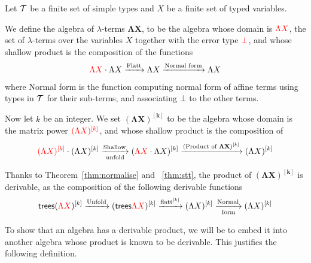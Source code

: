 \begin{example} Let $\Tt$ be a finite set of simple types and $X$ be a finite set of typed variables. 

We define the algebra of $\lambda$-terms $\mathbf{\Lambda X}$, to be the algebra whose domain is $\ranked{\Lambda X}$, the set of $\lambda$-terms over the variables $X$ together with the error type $\ranked{\bot}$, and whose shallow product is the composition of the functions
\begin{align*}
\ranked{\Lambda X}\cdot \Lambda X \xrightarrow{\text{Flatt}} \Lambda X \xrightarrow{\text{Normal form}} \Lambda X 
\end{align*}
where Normal form is the function computing normal form of affine terms using types in $\Tt$ for their sub-terms, and associating $\bot$ to the other terms. 



Now let $k$ be an integer. We set $\mathbf{(\Lambda X)^{[k]}}$ to be the algebra whose domain is the matrix power $\ranked{\mati k {(\Lambda X)}}$, and whose shallow product is the composition of 
\begin{align*}
\ranked{(\Lambda X)^{[k]}}\cdot (\Lambda X)^{[k]} \underset{\text{unfold}}{\xrightarrow{\text{Shallow}}} (\ranked{\Lambda X}\cdot \Lambda X)^{[k]}  \xrightarrow{(\text{Product of }\mathbf{\Lambda X})^{[k]}} (\Lambda X)^{[k]} 
\end{align*}

Thanks to Theorem~\ref{thm:normalise} and ~\ref{thm:stt}, the product of $\mathbf{(\Lambda X)^{[k]}}$ is derivable, as the composition of the following derivable functions
\begin{align*}
\trees(\ranked{\Lambda X})^{[k]} \xrightarrow{\text{Unfold}} (\trees \ranked{\Lambda X})^{[k]} \xrightarrow{\text{flatt}^{[k]}} 
 (\Lambda X)^{[k]} \underset{\text{form}}{\xrightarrow{\text{Normal}}}  (\Lambda X)^{[k]}
\end{align*}
\end{example}

To show that an algebra has a derivable product, we will be to embed it into another algebra whose 
product is known to be derivable. This justifies the following definition.

